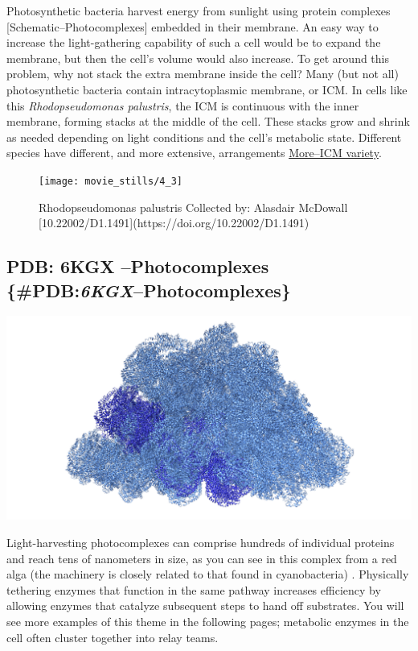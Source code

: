 \documentclass[]{tufte-book}
\begin{document}
Photosynthetic bacteria harvest energy from sunlight using protein
complexes {[}Schematic--Photocomplexes{]} embedded in their membrane. An
easy way to increase the light-gathering capability of such a cell would
be to expand the membrane, but then the cell's volume would also
increase. To get around this problem, why not stack the extra membrane
inside the cell? Many (but not all) photosynthetic bacteria contain
intracytoplasmic membrane, or ICM. In cells like this
\emph{Rhodopseudomonas palustris}, the ICM is continuous with the inner
membrane, forming stacks at the middle of the cell. These stacks grow
and shrink as needed depending on light conditions and the cell's
metabolic state. Different species have different, and more extensive,
arrangements \protect\hyperlink{moreicm-variety}{More--ICM variety}.

\begin{figure}
\texttt{[image: movie\_stills/4\_3]} \caption[Rhodopseudomonas palustris Collected by]{Rhodopseudomonas palustris Collected by: Alasdair McDowall [10.22002/D1.1491](https://doi.org/10.22002/D1.1491)}\label{fig:unnamed-chunk-61}
\end{figure}

\subsection{\texorpdfstring{PDB: 6KGX --Photocomplexes
\{\#PDB:\emph{6KGX}--Photocomplexes\}}{PDB: 6KGX --Photocomplexes \{\#PDB:6KGX--Photocomplexes\}}}\label{pdb-6kgx-photocomplexes-pdb6kgxphotocomplexes}

\includegraphics{img/schematics/4_3_1}

Light-harvesting photocomplexes can comprise hundreds of individual
proteins and reach tens of nanometers in size, as you can see in this
complex from a red alga (the machinery is closely related to that found
in cyanobacteria) \citet{ma2020}. Physically tethering enzymes that
function in the same pathway increases efficiency by allowing enzymes
that catalyze subsequent steps to hand off substrates. You will see more
examples of this theme in the following pages; metabolic enzymes in the
cell often cluster together into relay teams.
\end{document}
